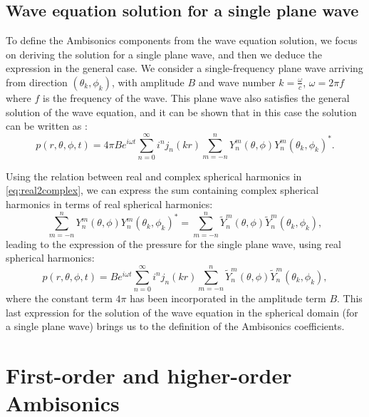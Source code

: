 \subsection{Wave equation solution for a single plane wave}

To define the Ambisonics components from the wave equation solution, we focus on deriving the solution for a single plane wave, and then we deduce the expression in the general case. We consider a single-frequency plane wave arriving from direction $(\theta_k,\phi_k)$, with amplitude $B$ and wave number $k=\frac{\omega}{c}$, $\omega = 2 \pi f$ where $f$ is the frequency of the wave. This plane wave also satisfies the general solution of the wave equation, and it can be shown that in this case the solution can be written as \cite[p.~227]{williams_fourier_2000}:
\begin{equation}
    p(r,\theta,\phi,t) = 4 \pi B e^{i \omega t} \sum_{n=0}^{\infty}  i^n  j_n(kr) \sum_{m=-n}^n Y_n^m(\theta,\phi) Y_n^m(\theta_k,\phi_k)^*.
\end{equation}

Using the relation between real and complex spherical harmonics in \eqref{eq:real2complex}, we can express the sum containing complex spherical harmonics in terms of real spherical harmonics:
\begin{equation}
    \sum_{m=-n}^n Y_n^m(\theta,\phi) Y_n^m(\theta_k,\phi_k)^* = \sum_{m=-n}^n \tilde{Y}_n^m(\theta,\phi) \tilde{Y}_n^m(\theta_k,\phi_k),
\end{equation}
leading to the expression of the pressure for the single plane wave, using real spherical harmonics:
\begin{equation}
\label{eq:planeWaveDecomposition}
    p(r,\theta,\phi,t) = B e^{i \omega t} \sum_{n=0}^{\infty}  i^n  j_n(kr) \sum_{m=-n}^n \tilde{Y}_n^m(\theta,\phi) \tilde{Y}_n^m(\theta_k,\phi_k),
\end{equation}
where the constant term $4 \pi$ has been incorporated in the amplitude term $B$. This last expression for the solution of the wave equation in the spherical domain (for a single plane wave) brings us to the definition of the Ambisonics coefficients.

\section{First-order and higher-order Ambisonics}
\label{sec:ambisonics}


